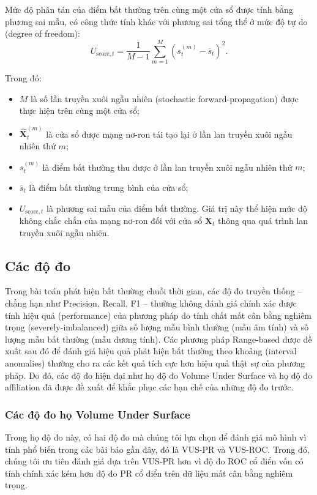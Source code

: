 Mức độ phân tán của điểm bất thường trên cùng một cửa sổ được tính bằng phương sai mẫu, có công thức tính khác với phương sai tổng thể ở mức độ tự do (degree of freedom):
\begin{equation}
U_{\mathrm{score},t}
=
\frac{1}{M-1}
\sum_{m=1}^{M}
\left(
s_t^{(m)}-\overline{s}_t
\right)^2.
\label{eq:score-uncertainty}
\end{equation}

Trong đó:
\begin{itemize}
    \item \(M\) là số lần truyền xuôi ngẫu nhiên (stochastic forward-propagation) được thực hiện trên cùng một cửa sổ;
    
    \item \(\widehat{\mathbf{X}}_t^{(m)}\) là cửa sổ được mạng nơ-ron tái tạo lại ở lần lan truyền xuôi ngẫu nhiên thứ \(m\);
    
    \item \(s_t^{(m)}\) là điểm bất thường thu được ở lần lan truyền xuôi ngẫu nhiên thứ \(m\);
    
    \item \(\overline{s}_t\) là điểm bất thường trung bình của cửa sổ;
    
    \item \(U_{\mathrm{score},t}\) là phương sai mẫu của điểm bất thường. Giá trị này thể hiện mức độ không chắc chắn của mạng nơ-ron đối với cửa sổ \(\mathbf{X}_t\) thông qua quá trình lan truyền xuôi ngẫu nhiên.
\end{itemize}

\subsection{Các độ đo}
Trong bài toán phát hiện bất thường chuỗi thời gian, các độ đo truyền thống -- chẳng hạn như Precision, Recall, F1 -- thường không đánh giá chính xác được tính hiệu quả (performance) của phương pháp do tính chất mất cân bằng nghiêm trọng (severely-imbalanced) giữa số lượng mẫu bình thường (mẫu âm tính) và số lượng mẫu bất thường (mẫu dương tính). Các phương pháp Range-based được đề xuất sau đó để đánh giá hiệu quả phát hiện bất thường theo khoảng (interval anomalies) thường cho ra các kết quả tích cực hơn hiệu quả thật sự của phương pháp. Do đó, các độ đo hiện đại như họ độ đo Volume Under Surface \cite{boniol2025vus} và họ độ đo affiliation \cite{10.1145/3534678.3539339} đã được đề xuất để khắc phục các hạn chế của những độ đo trước.

\subsubsection{Các độ đo họ Volume Under Surface}
Trong họ độ đo này, có hai độ đo mà chúng tôi lựa chọn để đánh giá mô hình vì tính phổ biến trong các bài báo gần đây, đó là VUS-PR và VUS-ROC. Trong đó, chúng tôi ưu tiên đánh giá dựa trên VUS-PR hơn vì độ đo ROC cổ điển vốn có tính chính xác kém hơn độ đo PR cổ điển trên dữ liệu mất cân bằng nghiêm trọng.

